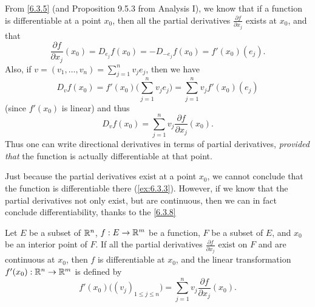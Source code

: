\begin{ac}\label{ac:6.3.2}
  From \cref{6.3.5} (and Proposition 9.5.3 from Analysis I), we know that if a function is differentiable at a point \(x_0\), then all the partial derivatives \(\frac{\partial f}{\partial x_j}\) exists at \(x_0\), and that
  \[
    \frac{\partial f}{\partial x_j}(x_0) = D_{e_j} f(x_0) = - D_{-e_j} f(x_0) = f'(x_0)(e_j).
  \]
  Also, if \(v = (v_1, \dots, v_n) = \sum_{j = 1}^n v_j e_j\), then we have
  \[
    D_v f(x_0) = f'(x_0) \bigg(\sum_{j = 1}^n v_j e_j\bigg) = \sum_{j = 1}^n v_j f'(x_0)(e_j)
  \]
  (since \(f'(x_0)\) is linear) and thus
  \[
    D_v f(x_0) = \sum_{j = 1}^n v_j \frac{\partial f}{\partial x_j}(x_0).
  \]
  Thus one can write directional derivatives in terms of partial derivatives, \emph{provided that} the function is actually differentiable at that point.
\end{ac}

\begin{note}
  Just because the partial derivatives exist at a point \(x_0\), we cannot conclude that the function is differentiable there (\cref{ex:6.3.3}).
  However, if we know that the partial derivatives not only exist, but are continuous, then we can in fact conclude differentiability, thanks to the \cref{6.3.8}
\end{note}

\begin{thm}\label{6.3.8}
  Let \(E\) be a subset of \(\mathbb{R}^n\), \(f : E \to \mathbb{R}^m\) be a function, \(F\) be a subset of \(E\), and \(x_0\) be an interior point of \(F\).
  If all the partial derivatives \(\frac{\partial f}{\partial x_j}\) exist on \(F\) and are continuous at \(x_0\), then \(f\) is differentiable at \(x_0\), and the linear transformation \(f'(x_0) : \mathbb{R}^n \to \mathbb{R}^m\) is defined by
  \[
    f'(x_0)\big((v_j)_{1 \leq j \leq n}\big) = \sum_{j = 1}^n v_j \frac{\partial f}{\partial x_j}(x_0).
  \]
\end{thm}

